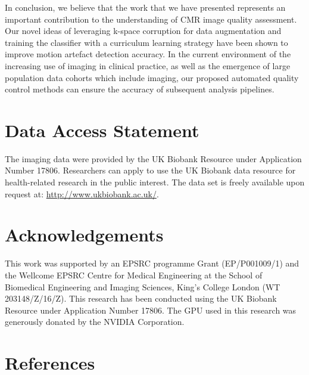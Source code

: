 \documentclass[preprint,12pt,authoryear]{elsarticle}
\begin{document}
In conclusion, we believe that the work that we have presented represents an important contribution to the understanding of CMR image quality assessment. Our novel ideas of leveraging k-space corruption for data augmentation and training the classifier with a curriculum learning strategy have been shown to improve motion artefact detection accuracy.  In the current environment of the increasing use of imaging in clinical practice, as well as the emergence of large population data cohorts which include imaging, our proposed automated quality control methods can ensure the accuracy of subsequent analysis pipelines.

\section*{Data Access Statement}
The imaging data were provided by the UK Biobank Resource under Application Number 17806. Researchers can apply to use the UK Biobank data resource for health-related research in the public interest. The  data set is freely available upon request at: \url{http://www.ukbiobank.ac.uk/}.

\section*{Acknowledgements}
This work was supported by an EPSRC programme Grant (EP/P001009/1) and the Wellcome EPSRC Centre for Medical Engineering at the School of Biomedical Engineering and Imaging Sciences, King’s College London (WT 203148/Z/16/Z). This research has been conducted using the UK Biobank Resource under Application Number 17806. The GPU used in this research was generously donated by the NVIDIA Corporation.


\section*{References}
%

\end{document}
